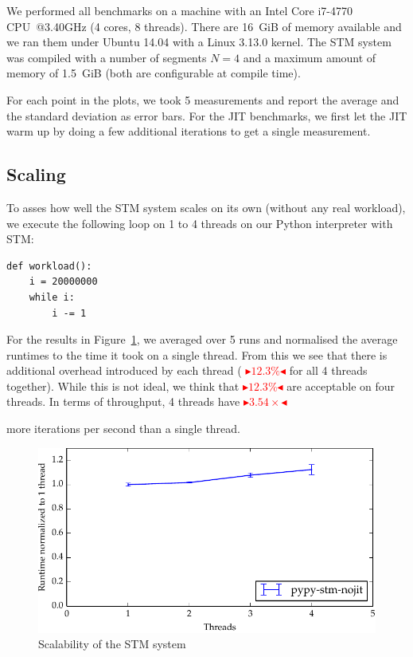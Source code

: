 \documentclass{sigplanconf}
\newcommand{\mynote}[2]{%
  \textcolor{red}{%
    \fbox{\bfseries\sffamily\scriptsize#1}%
    {\small$\blacktriangleright$\textsf{\emph{#2}}$\blacktriangleleft$}%
  }%
}
\newcommand\remi[1]{\mynote{Remi}{#1}}
\begin{document}
We performed all benchmarks on a machine with an Intel Core i7-4770
CPU~@3.40GHz (4 cores, 8 threads).  There are 16~GiB of memory
available and we ran them under Ubuntu 14.04 with a Linux 3.13.0
kernel. The STM system was compiled with a number of segments $N=4$
and a maximum amount of memory of 1.5~GiB (both are configurable at
compile time).

For each point in the plots, we took 5 measurements and report the
average and the standard deviation as error bars. For the JIT
benchmarks, we first let the JIT warm up by doing a few
additional iterations to get a single measurement.



\subsection{Scaling}

To asses how well the STM system scales on its own (without any real
workload), we execute the following loop on 1 to 4 threads on our
Python interpreter with STM:
\begin{lstlisting}
def workload():
    i = 20000000
    while i:
        i -= 1
\end{lstlisting}

For the results in Figure~\ref{fig:scaling}, we averaged over 5 runs
and normalised the average runtimes to the time it took on a single
thread. From this we see that there is additional overhead introduced
by each thread (\remi{$12.3\%$} for all 4 threads together). While this
is not ideal, we think that \remi{$12.3\%$} are acceptable on four
threads. In terms of throughput, 4 threads have \remi{$3.54\times$}
more iterations per second than a single thread.

\begin{figure}[h]
  \centering
  \includegraphics[width=1\columnwidth]{plots/scaling.pdf}
  \caption{Scalability of the STM system\label{fig:scaling}}
\end{figure}
\end{document}
